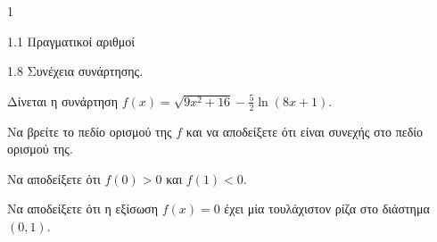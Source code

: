 \begin{ylh}{1}
    \item 1.1 Πραγματικοί αριθμοί
    \item 1.8 Συνέχεια συνάρτησης.
\end{ylh}
Δίνεται η συνάρτηση $f(x) = \sqrt{9x^2+16} - \frac{5}{2}\ln(8x+1)$.
\begin{alist}
\item Να βρείτε το πεδίο ορισμού της $f$ και να αποδείξετε ότι είναι συνεχής στο πεδίο ορισμού της. 
\item Να αποδείξετε ότι $f(0) > 0$ και $f(1) < 0$. 
\item Να αποδείξετε ότι η εξίσωση $f(x)=0$ έχει μία τουλάχιστον ρίζα στο διάστημα $(0,1)$. 
\end{alist}
